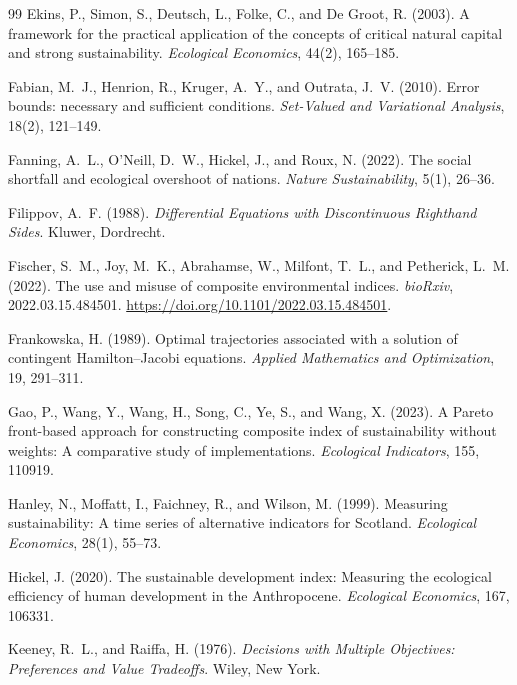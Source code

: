 \documentclass[preprint,11pt,authoryear]{elsarticle}
\theoremstyle{definition}
\theoremstyle{remark}
\begin{document}
\begin{thebibliography}{99}
 Ekins, P., Simon, S., Deutsch, L., Folke, C., and De Groot, R. (2003). A framework for the practical application of the concepts of critical natural capital and strong sustainability. \emph{Ecological Economics}, 44(2), 165--185.

 Fabian, M.~J., Henrion, R., Kruger, A.~Y., and Outrata, J.~V. (2010). Error bounds: necessary and sufficient conditions. \emph{Set-Valued and Variational Analysis}, 18(2), 121--149.

 Fanning, A.~L., O'Neill, D.~W., Hickel, J., and Roux, N. (2022). The social shortfall and ecological overshoot of nations. \emph{Nature Sustainability}, 5(1), 26--36.

 Filippov, A.~F. (1988). \emph{Differential Equations with Discontinuous Righthand Sides}. Kluwer, Dordrecht.

 Fischer, S.~M., Joy, M.~K., Abrahamse, W., Milfont, T.~L., and Petherick, L.~M. (2022). The use and misuse of composite environmental indices. \emph{bioRxiv}, 2022.03.15.484501. \url{https://doi.org/10.1101/2022.03.15.484501}.

 Frankowska, H. (1989). Optimal trajectories associated with a solution of contingent Hamilton--Jacobi equations. \emph{Applied Mathematics and Optimization}, 19, 291--311.

 Gao, P., Wang, Y., Wang, H., Song, C., Ye, S., and Wang, X. (2023). A Pareto front-based approach for constructing composite index of sustainability without weights: A comparative study of implementations. \emph{Ecological Indicators}, 155, 110919.

 Hanley, N., Moffatt, I., Faichney, R., and Wilson, M. (1999). Measuring sustainability: A time series of alternative indicators for Scotland. \emph{Ecological Economics}, 28(1), 55--73.

 Hickel, J. (2020). The sustainable development index: Measuring the ecological efficiency of human development in the Anthropocene. \emph{Ecological Economics}, 167, 106331.

 Keeney, R.~L., and Raiffa, H. (1976). \emph{Decisions with Multiple Objectives: Preferences and Value Tradeoffs}. Wiley, New York.


\end{thebibliography}
\end{document}
